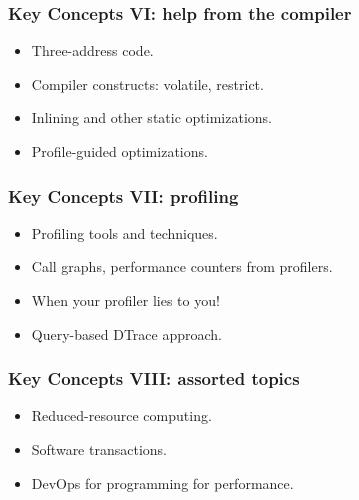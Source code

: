 \documentclass[aspectratio=43]{beamer}
\newenvironment{changemargin}[1]{%
  \begin{list}{}{%
    \setlength{\topsep}{0pt}%
    \setlength{\leftmargin}{#1}%
    \setlength{\rightmargin}{1em}
    \setlength{\listparindent}{\parindent}%
    \setlength{\itemindent}{\parindent}%
    \setlength{\parsep}{\parskip}%
  }%
  \item[]}{\end{list}}
\begin{document}
\begin{frame}
  \frametitle{Key Concepts VI: help from the compiler}

  \begin{changemargin}{2cm}
  \begin{itemize}
    \item Three-address code.
    \item Compiler constructs: volatile, restrict.
    \item Inlining and other static optimizations.
    \item Profile-guided optimizations.
  \end{itemize}
  \end{changemargin}
\end{frame}

\begin{frame}
  \frametitle{Key Concepts VII: profiling}

  \begin{changemargin}{2cm}
  \begin{itemize}
    \item Profiling tools and techniques.
    \item Call graphs, performance counters from profilers.
    \item When your profiler lies to you!
    \item Query-based DTrace approach.
  \end{itemize}
  \end{changemargin}
\end{frame}

\begin{frame}
  \frametitle{Key Concepts VIII: assorted topics}

  \begin{changemargin}{2cm}
  \begin{itemize}
    \item Reduced-resource computing.
    \item Software transactions.
    \item DevOps for programming for performance.
  \end{itemize}
  \end{changemargin}
\end{frame}
\end{document}
